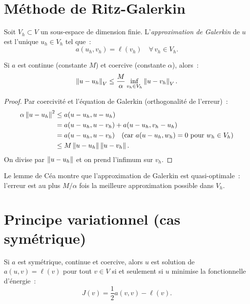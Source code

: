 \section{M\'ethode de Ritz-Galerkin}

\begin{definition}
Soit $V_h \subset V$ un sous-espace de dimension finie. L'\emph{approximation
de Galerkin} de $u$ est l'unique $u_h \in V_h$ tel que~:
\[
    a(u_h, v_h) = \ell(v_h) \quad \forall\, v_h \in V_h.
\]
\end{definition}

\begin{theoreme}[Lemme de C\'ea]
\label{thm:cea}
Si $a$ est continue (constante $M$) et coercive (constante $\alpha$), alors~:
\[
    \left\| u - u_h \right\|_V \leq \frac{M}{\alpha} \inf_{v_h \in V_h} \left\| u - v_h \right\|_V.
\]
\end{theoreme}

\begin{proof}
Par coercivit\'e et l'\'equation de Galerkin (orthogonalit\'e de l'erreur)~:
\begin{align*}
    \alpha\left\| u - u_h \right\|^2 &\leq a(u - u_h, u - u_h) \\
    &= a(u - u_h, u - v_h) + a(u - u_h, v_h - u_h) \\
    &= a(u - u_h, u - v_h) \quad \text{(car $a(u - u_h, w_h) = 0$ pour $w_h \in V_h$)} \\
    &\leq M\left\| u - u_h \right\|\left\| u - v_h \right\|.
\end{align*}
On divise par $\left\| u - u_h \right\|$ et on prend l'infimum sur $v_h$.
\end{proof}

\begin{remarque}
Le lemme de C\'ea montre que l'approximation de Galerkin est quasi-optimale~:
l'erreur est au plus $M/\alpha$ fois la meilleure approximation possible dans $V_h$.
\end{remarque}

\section{Principe variationnel (cas sym\'etrique)}

\begin{theoreme}
\label{thm:equivalence_var}
Si $a$ est sym\'etrique, continue et coercive, alors $u$ est solution de
$a(u,v) = \ell(v)$ pour tout $v \in V$ si et seulement si $u$ minimise la
fonctionnelle d'\'energie~:
\[
    J(v) = \frac{1}{2} a(v, v) - \ell(v).
\]
\end{theoreme}

